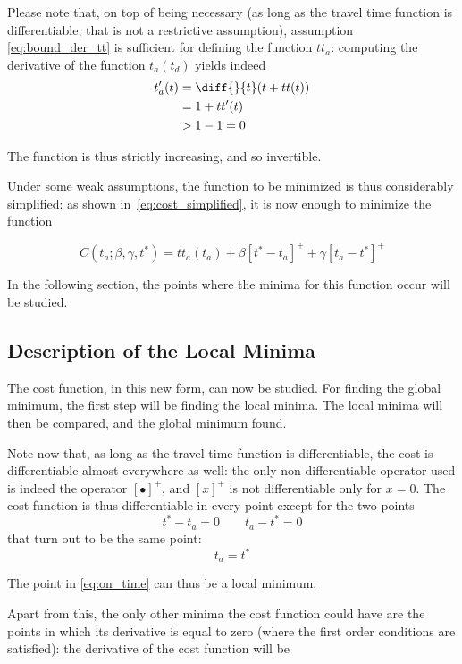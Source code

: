 Please note that, on top of being necessary (as long as the travel time function is differentiable, that is not a restrictive assumption),
assumption \eqref{eq:bound_der_tt} is sufficient for defining the function \(tt_a\):
computing the derivative of the function \(t_a(t_d)\) yields indeed
\begin{align*}
  t_a'(t) & = \diff{}{t}(t + tt(t)) \\
          & = 1 + tt'(t) \\
          & > 1 - 1 = 0
\end{align*}

The function is thus strictly increasing, and so invertible.

Under some weak assumptions, the function to be minimized is thus considerably simplified:
as shown in~\eqref{eq:cost_simplified}, it is now enough to minimize the function

\begin{equation}
  \label{eq:cost_simplified_final}
  C(t_a; \beta, \gamma, t^*) = tt_a(t_a) + \beta [t^* - t_a]^+ + \gamma [t_a - t^*]^+
\end{equation}

In the following section,
the points where the minima for this function occur will be studied.

\subsection{Description of the Local Minima}
\label{sec:local_min}

The cost function, in this new form, can now be studied.
For finding the global minimum, the first step will be finding the local minima.
The local minima will then be compared, and the global minimum found.

Note now that, as long as the travel time function is differentiable,
the cost is differentiable almost everywhere as well:
the only non-differentiable operator used is indeed the operator \([\bullet ]^+\),
and \([x]^+\) is not differentiable only for \(x = 0\).
The cost function is thus differentiable in every point except for the two points
\[ t^* - t_a = 0 \qquad t_a - t^* = 0 \]
that turn out to be the same point:
\begin{equation}
  \label{eq:on_time}
  t_a = t^*
\end{equation}

The point in \eqref{eq:on_time} can thus be a local minimum.

Apart from this, the only other minima the cost function could have are the points in which its derivative is equal to zero (where the first order conditions are satisfied):
the derivative of the cost function will be

